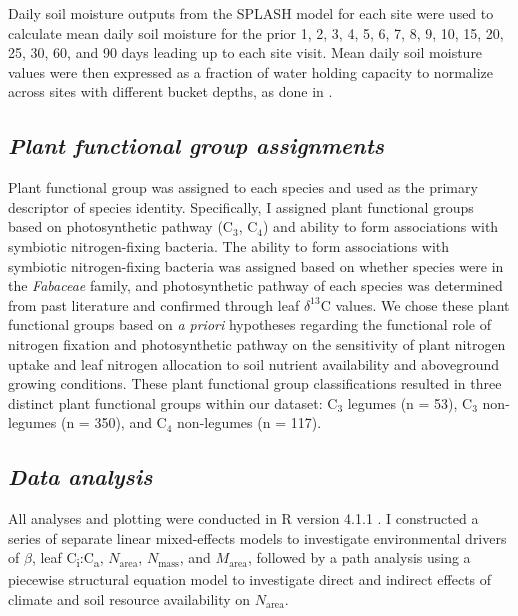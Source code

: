 Daily soil moisture outputs from the SPLASH model for each site were used to calculate mean daily soil moisture for the prior 1, 2, 3, 4, 5, 6, 7, 8, 9, 10, 15, 20, 25, 30, 60, and 90 days leading up to each site visit. Mean daily soil moisture values were then expressed as a fraction of water holding capacity to normalize across sites with different bucket depths, as done in .

\subsection{\textit{Plant functional group assignments}}
\noindent Plant functional group was assigned to each species and used as the primary descriptor of species identity. Specifically, I assigned plant functional groups based on photosynthetic pathway (C$_3$, C$_4$) and ability to form associations with symbiotic nitrogen-fixing bacteria. The ability to form associations with symbiotic nitrogen-fixing bacteria was assigned based on whether species were in the \textit{Fabaceae} family, and photosynthetic pathway of each species was determined from past literature and confirmed through leaf $\delta^{13}$C values. We chose these plant functional groups based on \textit{a priori} hypotheses regarding the functional role of nitrogen fixation and photosynthetic pathway on the sensitivity of plant nitrogen uptake and leaf nitrogen allocation to soil nutrient availability and aboveground growing conditions. These plant functional group classifications resulted in three distinct plant functional groups within our dataset: C$_3$ legumes (n = 53), C$_3$ non-legumes (n = 350), and C$_4$ non-legumes (n = 117).

\subsection{\textit{Data analysis}}
\noindent All analyses and plotting were conducted in R version 4.1.1 . I constructed a series of separate linear mixed-effects models to investigate environmental drivers of $\beta$, leaf C\textsubscript{i}:C\textsubscript{a}, $N_\mathrm{area}$, $N_\mathrm{mass}$, and $M_\mathrm{area}$, followed by a path analysis using a piecewise structural equation model to investigate direct and indirect effects of climate and soil resource availability on $N_\mathrm{area}$.

